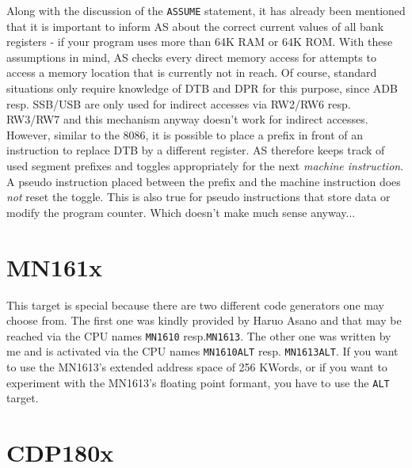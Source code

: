 \documentclass[12pt,twoside]{report}
\newcommand{\tty}[1]{{\tt #1}}
\newcommand{\asname}{{AS}}
\begin{document}
Along with the discussion of the {\tt ASSUME} statement, it has already
been mentioned that it is important to inform \asname{} about the correct current
values of all bank registers - if your program uses more than 64K RAM or
64K ROM.  With these assumptions in mind, \asname{} checks every direct memory
access for attempts to access a memory location that is currently not in
reach.  Of course, standard situations only require knowledge of DTB and
DPR for this purpose, since ADB resp. SSB/USB are only used for indirect
accesses via RW2/RW6 resp. RW3/RW7 and this mechanism anyway doesn't work
for indirect accesses.  However, similar to the 8086, it is possible to
place a prefix in front of an instruction to replace DTB by a different
register.  \asname{} therefore keeps track of used segment prefixes and
toggles appropriately for the next {\em machine instruction}.  A pseudo
instruction placed between the prefix and the machine instruction does
{\em not} reset the toggle.  This is also true for pseudo instructions
that store data or modify the program counter.  Which doesn't make much
sense anyway...


\section{MN161x}

This target is special because there are two different code generators one may
choose from.  The first one was kindly provided by Haruo Asano and that may be
reached via the CPU names \tty{MN1610} resp.\tty{MN1613}.  The other one was
written by me and is activated via the CPU names \tty{MN1610ALT} resp.
\tty{MN1613ALT}.  If you want to use the MN1613's extended address space of
256 KWords, or if you want to experiment with the MN1613's floating point
formant, you have to use the \tty{ALT} target.


\section{CDP180x}
\end{document}
